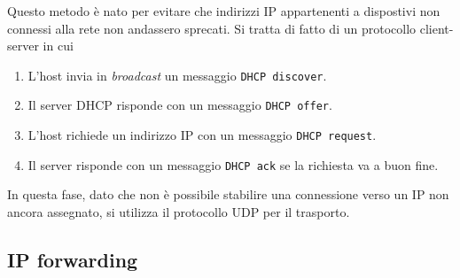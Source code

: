 Questo metodo è nato per evitare che indirizzi IP appartenenti a 
dispostivi non connessi alla rete non andassero sprecati. Si tratta 
di fatto di un protocollo client-server in cui
\begin{enumerate}
	\item L'host invia in \emph{broadcast} un messaggio 
		\verb|DHCP discover|.
	\item Il server DHCP risponde con un messaggio \verb|DHCP offer|.
	\item L'host richiede un indirizzo IP con un messaggio 
		\verb|DHCP request|.
	\item Il server risponde con un messaggio \verb|DHCP ack| se la 
		richiesta va a buon fine.
\end{enumerate}
In questa fase, dato che non è possibile stabilire una connessione 
verso un IP non ancora assegnato, si utilizza il protocollo UDP per 
il trasporto.

\subsection{IP forwarding}


